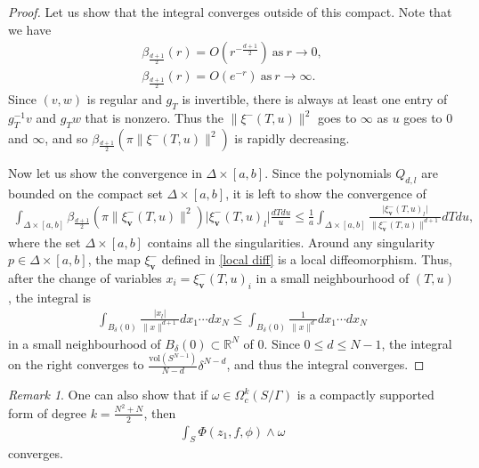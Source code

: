 \documentclass[twoside,a4paper,10pt]{article} %
\newcommand{\8}{\infty}
\newcommand{\vbf}{\mathbf{v}}
\newcommand{\R}{\mathbb{R}}
\newcommand{\vol}{\mathrm{vol}}
\theoremstyle{mytheoremstyle}
\theoremstyle{remark}
\newtheorem{rmk}{Remark}[section]
\numberwithin{equation}{section}
\begin{document}
\begin{proof}
Let us show that the integral converges outside of this compact. Note that we have \cite[Lemma.~3.8]{kudlaintegral}
\begin{align}
\beta_{\frac{d+1}{2}}(r)=O(r^{-\frac{d+1}{2}}) \ \textrm{as} \ r \rightarrow 0, \\
\beta_{\frac{d+1}{2}}(r)=O(e^{-r}) \ \textrm{as} \ r \rightarrow \8.
\end{align}Since $(v,w)$ is regular and $g_T$ is invertible, there is always at least one entry of  $g_T^{-1}v$ and $g_Tw$ that is nonzero. Thus the $\lVert \xi^-(T,u) \rVert^2$ goes to $\8$ as $u$ goes to $0$ and $\8$, and so $\beta_{\frac{d+1}{2}} \left (\pi \lVert \xi^-(T,u) \rVert^2 \right )$ is rapidly decreasing.

Now let us show the convergence in $\Delta \times [a,b]$. Since the polynomials $Q_{d,l}$ are bounded on the compact set $\Delta \times [a,b]$, it is left to show the convergence of
 \begin{align}
\int_{\Delta \times [a,b]} \beta_{\frac{d+1}{2}} \left (\pi \lVert \xi^-_\vbf(T,u) \rVert^2 \right ) \vert \xi^-_\vbf(T,u)_l \vert  \frac{dTdu}{u} \leq \frac{1}{a}\int_{\Delta \times [a,b]}  \frac{\vert \xi^-_\vbf(T,u)_l \vert}{\lVert \xi^-_\vbf(T,u) \rVert^{d+1} } dTdu,
\end{align}
where the set $\Delta \times [a,b]$ contains all the singularities. Around any singularity $p \in \Delta \times [a,b]$, the map $\xi_\vbf^-$ defined in \eqref{local diff} is a local diffeomorphism. Thus, after the change of variables $x_i=\xi_\vbf^-(T,u)_i$ in a small neighbourhood of $(T,u)$, the integral is
\begin{align}
\int_{B_\delta(0)}  \frac{\vert x_l \vert}{\lVert x \rVert^{d+1} }dx_1 \cdots dx_N \leq \int_{B_\delta(0)}  \frac{1}{\lVert x \rVert^{d} }dx_1 \cdots dx_N
\end{align}
in a small neighbourhood of $B_\delta(0) \subset \R^N$ of $0$. Since $0 \leq d \leq N-1$, the integral on the right converges to $\frac{\vol(S^{N-1})}{N-d}\delta^{N-d}$, and thus the integral converges.
\end{proof}


\begin{rmk} One can also show that if $\omega \in \Omega^k_c(S/\Gamma)$ is a compactly supported form of degree $k=\frac{N^2+N}{2}$, then
\begin{align}
\int_{S}\Phi(z_1,f,\phi) \wedge \omega
\end{align} converges. 
\end{rmk}
\end{document}
